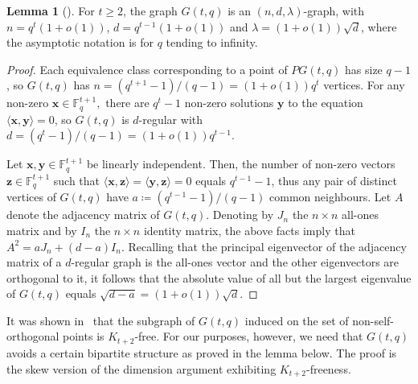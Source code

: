 \documentclass{article}
\theoremstyle{plain}
\newtheorem{lemma}[theorem]{Lemma}
\theoremstyle{definition}
\newtheorem{lemma}{Lemma}
\newcommand{\bF}{\mathbb{F}}
\newcommand{\bx}{\mathbf{x}}
\newcommand{\by}{\mathbf{y}}
\newcommand{\bz}{\mathbf{z}}
\begin{document}
\begin{lemma}[\cite{alon-krivelevich}] \label{lem:properties}
    For $t \ge 2$, the graph $G(t, q)$ is an $(n, d, \lambda)$-graph, with $n = q^t (1 + o(1))$, $d = q^{t-1}(1 + o(1))$ and $\lambda = (1+o(1)) \sqrt{d}$, where the asymptotic notation is for $q$ tending to infinity.
\end{lemma}
\begin{proof}
    Each equivalence class corresponding to a point of $PG(t, q)$ has size $q-1$, so $G(t,q)$ has $n = (q^{t+1} - 1) / (q-1) = (1+o(1)) q^t$ vertices. For any non-zero $\bx \in \bF_q^{t+1},$ there are $q^t - 1$ non-zero solutions $\by$ to the equation $\langle \bx, \by \rangle = 0$, so $G(t,q)$ is $d$-regular with $d = (q^t - 1) / (q-1) = (1+o(1))q^{t-1}.$

    Let $\bx, \by \in \bF_q^{t+1}$ be linearly independent. Then, the number of non-zero vectors $\bz \in \bF_q^{t+1}$ such that $\langle \bx, \bz \rangle = \langle \by, \bz \rangle = 0$ equals $q^{t-1} - 1$, thus any pair of distinct vertices of $G(t,q)$ have $a \coloneqq (q^{t-1} - 1) / (q-1)$ common neighbours. Let $A$ denote the adjacency matrix of $G(t, q)$. Denoting by $J_n$ the $n \times n$ all-ones matrix and by $I_n$ the $n \times n$ identity matrix, the above facts imply that $A^2 = aJ_n + (d-a)I_n.$ Recalling that the principal eigenvector of the adjacency matrix of a $d$-regular graph is the all-ones vector and the other eigenvectors are orthogonal to it, it follows that the absolute value of all but the largest eigenvalue of $G(t,q)$ equals $\sqrt{d-a} = (1+o(1)) \sqrt{d}.$
\end{proof}

It was shown in~\cite{alon-krivelevich} that the subgraph of $G(t, q)$ induced on the set of non-self-orthogonal points is $K_{t+2}$-free. For our purposes, however, we need that $G(t, q)$ avoids a certain bipartite structure as proved in the lemma below. The proof is the skew version of the dimension argument exhibiting $K_{t+2}$-freeness.
\end{document}
